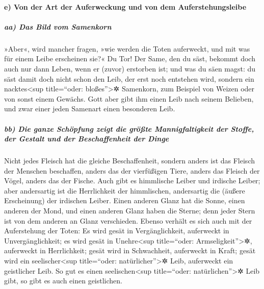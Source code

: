 \hypertarget{e-von-der-art-der-auferweckung-und-von-dem-auferstehungsleibe}{%
\paragraph{e) Von der Art der Auferweckung und von dem
Auferstehungsleibe}\label{e-von-der-art-der-auferweckung-und-von-dem-auferstehungsleibe}}

\hypertarget{aa-das-bild-vom-samenkorn}{%
\subparagraph{aa) Das Bild vom
Samenkorn}\label{aa-das-bild-vom-samenkorn}}

 »Aber«, wird mancher fragen, »wie werden die Toten
auferweckt, und mit was für einem Leibe erscheinen sie?« 
Du Tor! Der Same, den du säst, bekommt doch auch nur dann Leben, wenn er
(zuvor) erstorben ist;  und was du säen magst: du säst
damit doch nicht schon den Leib, der erst noch entstehen wird, sondern
ein nacktes\textless sup title=``oder: bloßes''\textgreater✲ Samenkorn,
zum Beispiel von Weizen oder von sonst einem Gewächs. 
Gott aber gibt ihm einen Leib nach seinem Belieben, und zwar einer jeden
Samenart einen besonderen Leib.

\hypertarget{bb-die-ganze-schuxf6pfung-zeigt-die-gruxf6uxdfte-mannigfaltigkeit-der-stoffe-der-gestalt-und-der-beschaffenheit-der-dinge}{%
\subparagraph{bb) Die ganze Schöpfung zeigt die größte Mannigfaltigkeit
der Stoffe, der Gestalt und der Beschaffenheit der
Dinge}\label{bb-die-ganze-schuxf6pfung-zeigt-die-gruxf6uxdfte-mannigfaltigkeit-der-stoffe-der-gestalt-und-der-beschaffenheit-der-dinge}}

 Nicht jedes Fleisch hat die gleiche Beschaffenheit,
sondern anders ist das Fleisch der Menschen beschaffen, anders das der
vierfüßigen Tiere, anders das Fleisch der Vögel, anders das der Fische.
 Auch gibt es himmlische Leiber und irdische Leiber; aber
andersartig ist die Herrlichkeit der himmlischen, andersartig die
(äußere Erscheinung) der irdischen Leiber.  Einen anderen
Glanz hat die Sonne, einen anderen der Mond, und einen anderen Glanz
haben die Sterne; denn jeder Stern ist von dem anderen an Glanz
verschieden.  Ebenso verhält es sich auch mit der
Auferstehung der Toten: Es wird gesät in Vergänglichkeit, auferweckt in
Unvergänglichkeit;  es wird gesät in Unehre\textless sup
title=``oder: Armseligkeit''\textgreater✲, auferweckt in Herrlichkeit;
gesät wird in Schwachheit, auferweckt in Kraft;  gesät
wird ein seelischer\textless sup title=``oder:
natürlicher''\textgreater✲ Leib, auferweckt ein geistlicher Leib. So gut
es einen seelischen\textless sup title=``oder:
natürlichen''\textgreater✲ Leib gibt, so gibt es auch einen geistlichen.

